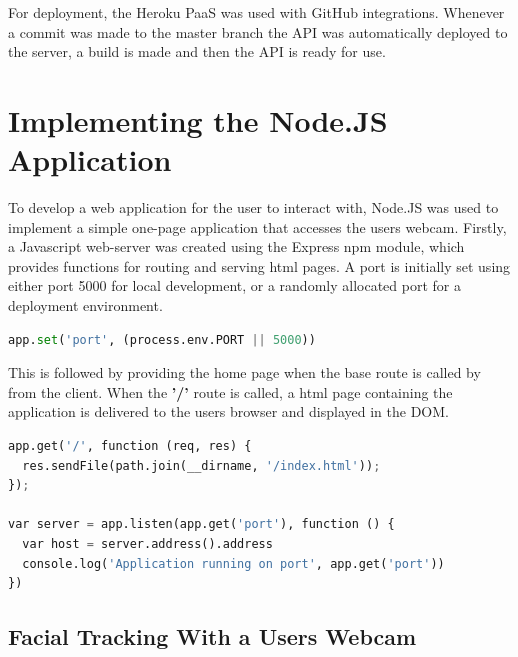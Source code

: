For deployment, the Heroku PaaS was used with GitHub integrations. Whenever a commit was made to the master branch the API was automatically deployed to the server, a build is made and then the API is ready for use.


\section{Implementing the Node.JS Application}
To develop a web application for the user to interact with, Node.JS was used to implement a simple one-page application that accesses the users webcam. Firstly, a Javascript web-server was created using the Express npm module, which provides functions for routing and serving html pages. A port is initially set using either port 5000 for local development, or a randomly allocated port for a deployment environment. 

\begin{lstlisting}[language=python, frame=single]
	app.set('port', (process.env.PORT || 5000))
\end{lstlisting}

This is followed by providing the home page when the base route is called by from the client. When the \textbf{'/'} route is called, a html page containing the application is delivered to the users browser and displayed in the DOM.

\begin{lstlisting}[language=python, frame=single]
app.get('/', function (req, res) {
  res.sendFile(path.join(__dirname, '/index.html'));
});

var server = app.listen(app.get('port'), function () {
  var host = server.address().address
  console.log('Application running on port', app.get('port'))
})
\end{lstlisting}

\subsection{Facial Tracking With a Users Webcam}

